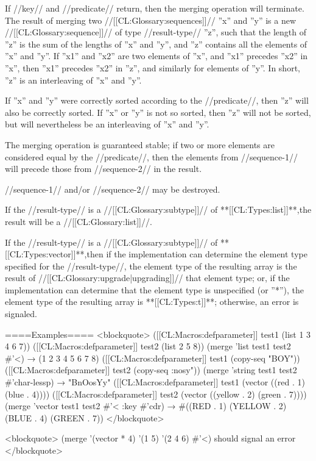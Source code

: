 If //key// and //predicate// return, then the merging operation will terminate. The result of merging two //[[CL:Glossary:sequences]]// ''x'' and ''y'' is a new //[[CL:Glossary:sequence]]// of type //result-type// ''z'', such that the length of ''z'' is the sum of the lengths of ''x'' and ''y'', and ''z'' contains all the elements of ''x'' and ''y''. If ''x1'' and ''x2'' are two elements of ''x'', and ''x1'' precedes ''x2'' in ''x'', then ''x1'' precedes ''x2'' in ''z'', and similarly for elements of ''y''. In short, ''z'' is an interleaving of ''x'' and ''y''.

If ''x'' and ''y'' were correctly sorted according to the //predicate//, then ''z'' will also be correctly sorted. If ''x'' or ''y'' is not so sorted, then ''z'' will not be sorted, but will nevertheless be an interleaving of ''x'' and ''y''.

The merging operation is guaranteed stable; if two or more elements are considered equal by the //predicate//, then the elements from //sequence-1// will precede those from //sequence-2// in the result.

//sequence-1// and/or //sequence-2// may be destroyed.

If the //result-type// is a //[[CL:Glossary:subtype]]// of **[[CL:Types:list]]**,the result will be a //[[CL:Glossary:list]]//.

If the //result-type// is a //[[CL:Glossary:subtype]]// of **[[CL:Types:vector]]**,then if the implementation can determine the element type specified for the //result-type//, the element type of the resulting array is the result of //[[CL:Glossary:upgrade|upgrading]]// that element type; or, if the implementation can determine that the element type is unspecified (or ''*''), the element type of the resulting array is **[[CL:Types:t]]**; otherwise, an error is signaled.

====Examples==== <blockquote> ([[CL:Macros:defparameter]] test1 (list 1 3 4 6 7)) ([[CL:Macros:defparameter]] test2 (list 2 5 8)) (merge 'list test1 test2 #'<) → (1 2 3 4 5 6 7 8) ([[CL:Macros:defparameter]] test1 (copy-seq "BOY")) ([[CL:Macros:defparameter]] test2 (copy-seq :nosy")) (merge 'string test1 test2 #'char-lessp) → "BnOosYy" ([[CL:Macros:defparameter]] test1 (vector ((red . 1) (blue . 4)))) ([[CL:Macros:defparameter]] test2 (vector ((yellow . 2) (green . 7)))) (merge 'vector test1 test2 #'< :key #'cdr) → #((RED . 1) (YELLOW . 2) (BLUE . 4) (GREEN . 7)) </blockquote>

<blockquote> (merge '(vector * 4) '(1 5) '(2 4 6) #'<) should signal an error </blockquote>

